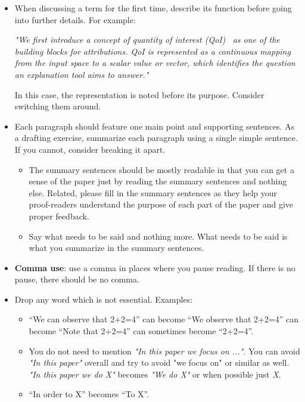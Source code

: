 \begin{itemize}
\item{} When discussing a term for the first time, describe its function before going into further
  details. For example:

  \textit{"We first introduce a concept of \textit{quantity of interest}
    (QoI)~\cite{leino2018influence} as one of the building blocks for attributions. QoI is
    represented as a continuous mapping from the input space to a scalar value or vector, which
    identifies the question an explanation tool aims to answer."}

  In this case, the representation is noted before its purpose. Consider switching them around.

\item{} Each paragraph should feature one main point and supporting sentences. As a drafting
  exercise, summarize each paragraph using a single simple sentence. If you cannot, consider
  breaking it apart.

  \begin{itemize}
    \item{} The summary sentences should be mostly readable in that you can get a sense of the
      paper just by reading the summary sentences and nothing else. Related, please fill in the
      summary sentences as they help your proof-readers understand the purpose of each part of the
      paper and give proper feedback.
    \item{} Say what needs to be said and nothing more. What needs to be said is what you summarize
      in the summary sentences.
  \end{itemize}

\item{} \textbf{Comma use}: use a comma in places where you pause reading. If there is no pause,
  there should be no comma.

\item{} Drop any word which is not essential. Examples:
  \begin{itemize}
  \item{} ``We can observe that 2+2=4'' can become ``We observe that 2+2=4'' can become ``Note that
    2+2=4'' can sometimes become ``2+2=4''.
  \item{} You do not need to mention \textit{"In this paper we focus on ..."}. You can avoid
    \textit{"In this paper"} overall and try to avoid "we focus on" or similar as well. \textit{"In
      this paper we do X"} becomes \textit{"We do X"} or when possible just \textit{X}.
  \item{} ``In order to X'' becomes ``To X''.
  \end{itemize}
\end{itemize}

